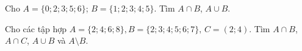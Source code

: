 \begin{bt}%
Cho $A=\{0; 2; 3; 5; 6\}$; $B=\{1; 2; 3; 4; 5\}$. Tìm $A \cap B$, $A \cup B$.
\end{bt}

\begin{bt}%
	Cho các tập hợp $A=\{2 ; 4 ; 6 ; 8\}, B=\{2 ; 3 ; 4 ; 5 ; 6 ; 7\},\,C=(2 ; 4)$.
	Tìm $A \cap B$, $A\cap C$, $A \cup B$ và $A\setminus B$.
\end{bt}

